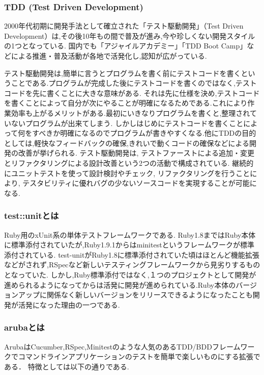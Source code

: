 \subsubsection{TDD (Test Driven Development)}
2000年代初期に開発手法として確立された「テスト駆動開発」（Test Driven Development）は,その後10年もの間で普及が進み,今や珍しくない開発スタイルの1つとなっている.
国内でも「アジャイルアカデミー」「TDD Boot Camp」などによる推進・普及活動が各地で活発化し,認知が広がっている\cite{3}.

テスト駆動開発は,簡単に言うとプログラムを書く前にテストコードを書くということである.プログラムが完成した後にテストコードを書くのではなく,テストコードを先に書くことに大きな意味がある.
それは先に仕様を決め,テストコードを書くことによって自分が次にやることが明確になるためである.これにより作業効率も上がるメリットがある.最初にいきなりプログラムを書くと,整理されていないプログラムが出来てしまう.
しかしはじめにテストコードを書くことによって何をすべきか明確になるのでプログラムが書きやすくなる.他にTDDの目的としては,軽快なフィードバックの確保,きれいで動くコードの確保などによる開発の改善が挙げられる.
テスト駆動開発は, テストファーストによる追加・変更とリファクタリングによる設計改善という2つの活動で構成されている. 継続的にユニットテストを使って設計検討やチェック, リファクタリングを行うことにより, テスタビリティに優れバグの少ないソースコードを実現することが可能になる. 

\subsubsection{test::unitとは}
Ruby用のxUnit系の単体テストフレームワークである. Ruby1.8まではRuby本体に標準添付されていたが,Ruby1.9.1からはminitestというフレームワークが標準添付されている.
test-unitがRuby1.8に標準添付されていた頃はほとんど機能拡張などがされず,RSpecなど新しいテスティングフレームワークから見劣りするものとなっていた.
しかし,Ruby標準添付ではなく,１つのプロジェクトとして開発が進められるようになってからは活発に開発が進められている.Ruby本体のバージョンアップに関係なく新しいバージョンをリリースできるようになったことも開発が活発になった理由の一つである\cite{4}.

\subsubsection{arubaとは}
ArubaはCucumber,RSpec,Minitestのような人気のあるTDD/BDDフレームワークでコマンドラインアプリケーションのテストを簡単で楽しいものにする拡張である．
特徴としては以下の通りである\cite{5}.

